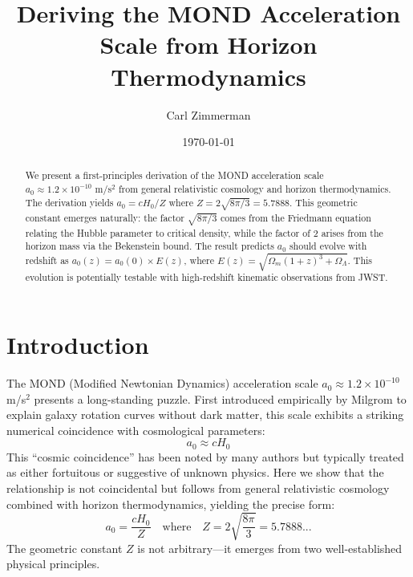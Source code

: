 \documentclass[twocolumn,showpacs,preprintnumbers,amsmath,amssymb,prd]{revtex4-2}
\begin{document}
\title{Deriving the MOND Acceleration Scale from Horizon Thermodynamics}

\author{Carl Zimmerman}

\date{\today}

\begin{abstract}
We present a first-principles derivation of the MOND acceleration scale $a_0 \approx 1.2\times10^{-10}$ m/s$^2$ from general relativistic cosmology and horizon thermodynamics. The derivation yields $a_0 = cH_0/Z$ where $Z = 2\sqrt{8\pi/3} = 5.7888$. This geometric constant emerges naturally: the factor $\sqrt{8\pi/3}$ comes from the Friedmann equation relating the Hubble parameter to critical density, while the factor of 2 arises from the horizon mass via the Bekenstein bound. The result predicts $a_0$ should evolve with redshift as $a_0(z) = a_0(0) \times E(z)$, where $E(z) = \sqrt{\Omega_m(1+z)^3 + \Omega_\Lambda}$. This evolution is potentially testable with high-redshift kinematic observations from JWST.
\end{abstract}


\maketitle

\section{Introduction}

The MOND (Modified Newtonian Dynamics) acceleration scale $a_0 \approx 1.2\times10^{-10}$ m/s$^2$ presents a long-standing puzzle. First introduced empirically by Milgrom \cite{Milgrom1983} to explain galaxy rotation curves without dark matter, this scale exhibits a striking numerical coincidence with cosmological parameters:
\begin{equation}
a_0 \approx cH_0
\end{equation}
This ``cosmic coincidence'' has been noted by many authors \cite{Milgrom1999,Sanders1998,Milgrom2020,Famaey2012} but typically treated as either fortuitous or suggestive of unknown physics. Here we show that the relationship is not coincidental but follows from general relativistic cosmology combined with horizon thermodynamics, yielding the precise form:
\begin{equation}
a_0 = \frac{cH_0}{Z} \quad \text{where} \quad Z = 2\sqrt{\frac{8\pi}{3}} = 5.7888...
\label{eq:main}
\end{equation}
The geometric constant $Z$ is not arbitrary---it emerges from two well-established physical principles.
\end{document}
